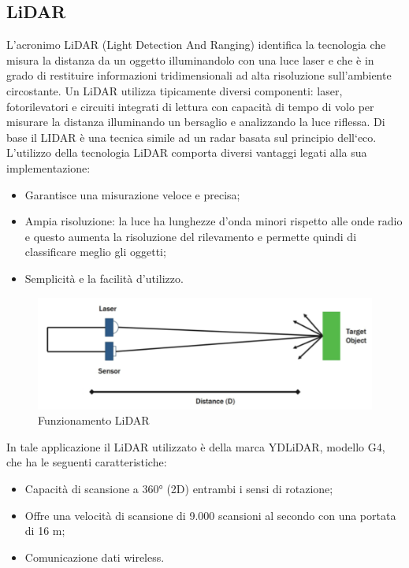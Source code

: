 \subsection{LiDAR}
L’acronimo LiDAR (Light Detection And Ranging) \cite{lidar} \cite{lidar2} identifica la tecnologia che  misura la distanza da un oggetto illuminandolo con una luce laser e che è  in grado di restituire informazioni tridimensionali ad alta risoluzione sull’ambiente circostante. Un LiDAR utilizza tipicamente diversi componenti: laser, fotorilevatori e circuiti integrati di lettura con capacità di tempo di volo per misurare la distanza illuminando un bersaglio e analizzando la luce riflessa.
Di base il LIDAR è una tecnica simile ad un radar basata sul principio dell‘eco.\\
L’utilizzo della tecnologia LiDAR comporta diversi vantaggi legati alla sua implementazione:
\begin{itemize}
\item Garantisce una misurazione veloce e precisa;
\item Ampia risoluzione: la luce ha lunghezze d’onda minori rispetto alle onde radio e questo aumenta la risoluzione del rilevamento e permette quindi di classificare meglio gli oggetti;
\item Semplicità e la facilità d’utilizzo.
\end{itemize}

\begin{figure} [H]
    \centering
    \includegraphics[width=0.5\linewidth]{img/Lidar.PNG}
    \caption{Funzionamento LiDAR}
    \label{fig:Lidar}
\end{figure}

In tale applicazione il LiDAR utilizzato è della marca YDLiDAR, modello G4, che ha le seguenti caratteristiche:
\begin{itemize}
\item Capacità di scansione a 360° (2D) entrambi i sensi di rotazione;
\item Offre una velocità di scansione di 9.000 scansioni al secondo con una portata di 16 m;
\item Comunicazione dati wireless.
\end{itemize}






